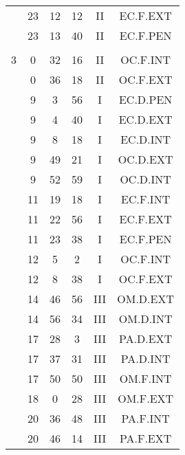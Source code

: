 \documentclass[12pt, a4paper]{article}
\begin{document}
\begin{multicols}{3}
{\begin{tabular}{c c c c c c}
	 	 	 	 & 23 & 12 & 12 & II & EC.F.EXT\\%
	 	 	 	 & 23 & 13 & 40 & II & EC.F.PEN\\%
	 	 	 	 & & & & & \\%
	 	 	 	3 & 0 & 32 & 16 & II & OC.F.INT\\%
	 	 	 	 & 0 & 36 & 18 & II & OC.F.EXT\\%
	 	 	 	 & 9 & 3 & 56 & I & EC.D.PEN\\%
	 	 	 	 & 9 & 4 & 40 & I & EC.D.EXT\\%
	 	 	 	 & 9 & 8 & 18 & I & EC.D.INT\\%
	 	 	 	 & 9 & 49 & 21 & I & OC.D.EXT\\%
	 	 	 	 & 9 & 52 & 59 & I & OC.D.INT\\%
	 	 	 	 & 11 & 19 & 18 & I & EC.F.INT\\%
	 	 	 	 & 11 & 22 & 56 & I & EC.F.EXT\\%
	 	 	 	 & 11 & 23 & 38 & I & EC.F.PEN\\%
	 	 	 	 & 12 & 5 & 2 & I & OC.F.INT\\%
	 	 	 	 & 12 & 8 & 38 & I & OC.F.EXT\\%
	 	 	 	 & 14 & 46 & 56 & III & OM.D.EXT\\%
	 	 	 	 & 14 & 56 & 34 & III & OM.D.INT\\%
	 	 	 	 & 17 & 28 & 3 & III & PA.D.EXT\\%
	 	 	 	 & 17 & 37 & 31 & III & PA.D.INT\\%
	 	 	 	 & 17 & 50 & 50 & III & OM.F.INT\\%
	 	 	 	 & 18 & 0 & 28 & III & OM.F.EXT\\%
	 	 	 	 & 20 & 36 & 48 & III & PA.F.INT\\%
	 	 	 	 & 20 & 46 & 14 & III & PA.F.EXT\\%

\end{tabular}}
\end{multicols}
\end{document}
